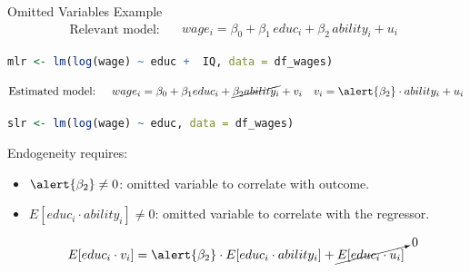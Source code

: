 \documentclass[11pt, aspectratio = 169]{beamer}
\begin{document}
\begin{frame}[fragile]{Omitted Variables Example}
\vspace{-2mm}
\[
\text{Relevant model: }
\begin{aligned}
    \quad wage_i = \beta_0 + \beta_1\, educ_i + \beta_2\, ability_i + u_i
\end{aligned}
\]
\begin{lstlisting}[language=R]
    mlr <- lm(log(wage) ~ educ +  IQ, data = df_wages)
\end{lstlisting}
\pause
\[
\text{Estimated model: }
\begin{aligned}
        \quad wage_{i} = \beta_0 + \beta_1 educ_{i} + \cancel{\beta_2 ability_{i}} + v_i \quad v_i =  \alert{\beta_2} \cdot ability_{i} + u_i
\end{aligned}
\]
\begin{lstlisting}[language=R]
    slr <- lm(log(wage) ~ educ, data = df_wages)
\end{lstlisting}
\pause
Endogeneity requires:
\begin{itemize}
    \item $\alert{\beta_2} \neq 0$: omitted variable to correlate with outcome.
    \item $E[educ_i \cdot ability_i] \neq 0$: omitted variable to correlate with the regressor.
\end{itemize}
 \begin{align*}
    E[educ_{i} \cdot v_i] 
     = \alert{\beta_2} \cdot E[educ_i \cdot ability_i] + \cancelto{0}{E[educ_i \cdot u_i]}
\end{align*}
\end{frame}
\end{document}
